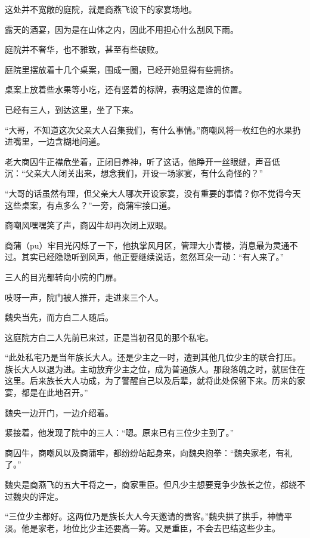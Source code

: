 
\begin{this_body}

这处并不宽敞的庭院，就是商燕飞设下的家宴场地。

露天的酒宴，因为是在山体之内，因此不用担心什么刮风下雨。

庭院并不奢华，也不雅致，甚至有些破败。

庭院里摆放着十几个桌案，围成一圈，已经开始显得有些拥挤。

桌案上放着些水果等小吃，还有竖着的标牌，表明这是谁的位置。

已经有三人，到达这里，坐了下来。

“大哥，不知道这次父亲大人召集我们，有什么事情。”商嘲风将一枚红色的水果扔进嘴里，一边含糊地问道。

老大商囚牛正襟危坐着，正闭目养神，听了这话，他睁开一丝眼缝，声音低沉：“父亲大人闭关出来，想念我们，开设一场家宴，有什么奇怪的？”

“大哥的话虽然有理，但父亲大人哪次开设家宴，没有重要的事情？你不觉得今天这些桌案，有点多么？”一旁，商蒲牢接口道。

商嘲风嘿嘿笑了声，商囚牛却再次闭上双眼。

商蒲（pu）牢目光闪烁了一下，他执掌风月区，管理大小青楼，消息最为灵通不过。其实已经隐隐听到风声，他正要继续说话，忽然耳朵一动：“有人来了。”

三人的目光都转向小院的门扉。

吱呀一声，院门被人推开，走进来三个人。

魏央当先，而方白二人随后。

这庭院方白二人先前已来过，正是当初召见的那个私宅。

“此处私宅乃是当年族长大人。还是少主之一时，遭到其他几位少主的联合打压。族长大人以退为进。主动放弃少主之位，成为普通族人。那段落魄之时，就居住在这里。后来族长大人功成，为了警醒自己以及后辈，就将此处保留下来。历来的家宴，都是在此地召开。”

魏央一边开门，一边介绍着。

紧接着，他发现了院中的三人：“嗯。原来已有三位少主到了。”

商囚牛，商嘲风以及商蒲牢，都纷纷站起身来，向魏央抱拳：“魏央家老，有礼了。”

魏央是商燕飞的五大干将之一，商家重臣。但凡少主想要竞争少族长之位，都绕不过魏央的评定。

“三位少主都好。这两位乃是族长大人今天邀请的贵客。”魏央拱了拱手，神情平淡。他是家老，地位比少主还要高一筹。又是重臣，不会去巴结这些少主。


\end{this_body}
